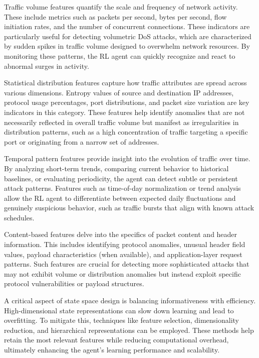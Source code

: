 \documentclass{report}
\begin{document}
Traffic volume features quantify the scale and frequency of network activity. These include metrics such as packets per second, bytes per second, flow initiation rates, and the number of concurrent connections. These indicators are particularly useful for detecting volumetric DoS attacks, which are characterized by sudden spikes in traffic volume designed to overwhelm network resources. By monitoring these patterns, the RL agent can quickly recognize and react to abnormal surges in activity.

Statistical distribution features capture how traffic attributes are spread across various dimensions. Entropy values of source and destination IP addresses, protocol usage percentages, port distributions, and packet size variation are key indicators in this category. These features help identify anomalies that are not necessarily reflected in overall traffic volume but manifest as irregularities in distribution patterns, such as a high concentration of traffic targeting a specific port or originating from a narrow set of addresses.

Temporal pattern features provide insight into the evolution of traffic over time. By analyzing short-term trends, comparing current behavior to historical baselines, or evaluating periodicity, the agent can detect subtle or persistent attack patterns. Features such as time-of-day normalization or trend analysis allow the RL agent to differentiate between expected daily fluctuations and genuinely suspicious behavior, such as traffic bursts that align with known attack schedules.

Content-based features delve into the specifics of packet content and header information. This includes identifying protocol anomalies, unusual header field values, payload characteristics (when available), and application-layer request patterns. Such features are crucial for detecting more sophisticated attacks that may not exhibit volume or distribution anomalies but instead exploit specific protocol vulnerabilities or payload structures.

A critical aspect of state space design is balancing informativeness with efficiency. High-dimensional state representations can slow down learning and lead to overfitting. To mitigate this, techniques like feature selection, dimensionality reduction, and hierarchical representations can be employed. These methods help retain the most relevant features while reducing computational overhead, ultimately enhancing the agent’s learning performance and scalability.
\end{document}
